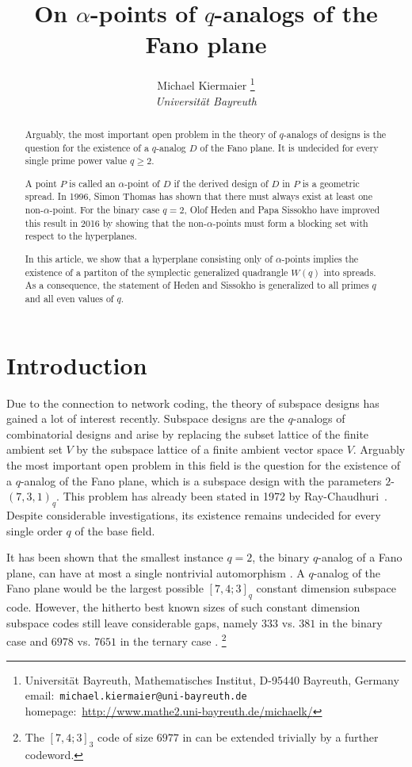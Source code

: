 \documentclass[a4paper,abstracton,12pt]{scrartcl}
\title{On $\alpha$-points of $q$-analogs of the Fano plane}
\author{
Michael Kiermaier
\thanks{
Universität Bayreuth, Mathematisches Institut, D-95440 Bayreuth, Germany
\newline
email:~\texttt{michael.kiermaier@uni-bayreuth.de}
\newline
homepage:~\url{http://www.mathe2.uni-bayreuth.de/michaelk/}
}\\
\emph{Universität Bayreuth}
}
\theoremstyle{definition}
\theoremstyle{remark}
\begin{document}
\maketitle
\begin{abstract}
Arguably, the most important open problem in the theory of $q$-analogs of designs is the question for the existence of a $q$-analog $D$ of the Fano plane.
It is undecided for every single prime power value $q \geq 2$.

A point $P$ is called an $\alpha$-point of $D$ if the derived design of $D$ in $P$ is a geometric spread.
In 1996, Simon Thomas has shown that there must always exist at least one non-$\alpha$-point.
For the binary case $q = 2$, Olof Heden and Papa Sissokho have improved this result in 2016 by showing that the non-$\alpha$-points must form a blocking set with respect to the hyperplanes.

In this article, we show that a hyperplane consisting only of $\alpha$-points implies the existence of a partiton of the symplectic generalized quadrangle $W(q)$ into spreads.
As a consequence, the statement of Heden and Sissokho is generalized to all primes $q$ and all even values of $q$.
\end{abstract}

\section{Introduction}
Due to the connection to network coding, the theory of subspace designs has gained a lot of interest recently.
Subspace designs are the $q$-analogs of combinatorial designs and arise by replacing the subset lattice of the finite ambient set $V$ by the subspace lattice of a finite ambient vector space $V$.
Arguably the most important open problem in this field is the question for the existence of a $q$-analog of the Fano plane, which is a subspace design with the parameters $2$-$(7,3,1)_q$.
This problem has already been stated in 1972 by Ray-Chaudhuri~\cite[Problem~28]{Berge-RayChaudhuri-1974-LNMa411:278-287}.
Despite considerable investigations, its existence remains undecided for every single order $q$ of the base field.

It has been shown that the smallest instance $q=2$, the binary $q$-analog of a Fano plane, can have at most a single nontrivial automorphism \cite{Braun-Kiermaier-Nakic-2016-EuJC51:443-457,Kiermaier-Kurz-Wassermann-2018-DCC86[2]:239-250}.
A $q$-analog of the Fano plane would be the largest possible $[7,4;3]_q$ constant dimension subspace code.
However, the hitherto best known sizes of such constant dimension subspace codes still leave considerable gaps, namely $333$ vs. $381$ in the binary case \cite{Heinlein-Kiermaier-Kurz-Wassermann-2019-AiMoC13[3]:457-475} and $6978$ vs. $7651$ in the ternary case \cite{Honold-Kiermaier-2016}.%
\footnote{The $[7,4;3]_3$ code of size $6977$ in \cite{Honold-Kiermaier-2016} can be extended trivially by a further codeword.}
\end{document}
